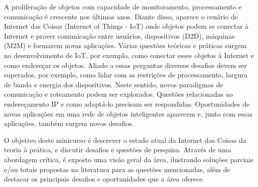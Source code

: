 \documentclass{SBCbookchapter}
\begin{document}
\begin{resumo}
\begin{otherlanguage}{brazilian}
A proliferação de objetos com capacidade de monitoramento, processamento e 
comunicação é crescente nos últimos anos. Diante disso, aparece o cenário de 
Internet das Coisas (Internet of Things - IoT) onde objetos podem se conectar à 
Internet e prover comunicação entre usuários, dispositivos (D2D), máquinas (M2M) 
e formarem novas aplicações. Várias questões teóricas e práticas surgem no 
desenvolvimento de IoT, por exemplo, como conectar esses objetos à Internet e 
como endereçar os objetos. Aliado a essas perguntas diversos desafios devem ser 
superados, por exemplo, como lidar com as restrições de processamento, largura 
de banda e energia dos dispositivos. Neste sentido, novos paradigmas de 
comunicação e roteamento podem ser explorados. Questões relacionadas ao 
endereçamento IP e como adaptá-lo precisam ser respondidas. Oportunidades de 
novas aplicações em uma rede de objetos inteligentes aparecem e, junto com essas 
aplicações, também surgem novos desafios. 

O objetivo deste minicurso é descrever o estado atual da Internet das Coisas da 
teoria à prática, e discutir desafios e questões de pesquisa. Através de uma 
abordagem crítica, é exposto uma visão geral da área, ilustrando soluções 
parciais e/ou totais propostas na literatura para as questões mencionadas, além 
de destacar os principais desafios e oportunidades que a área oferece. 



\end{otherlanguage}
\end{resumo}
\end{document}
